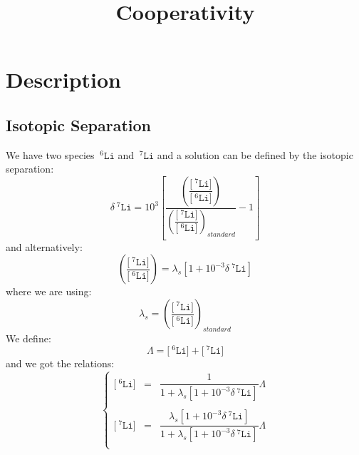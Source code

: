 \documentclass[aps,onecolumn,11pt]{revtex4}
\newcommand{\mychem}[1]{\mathtt{#1}}
\newcommand{\myconc}[1]{\big[#1\big]}
\newcommand{\spLi}[1]{{\!~^{#1}\mychem{Li}}}
\newcommand{\Li}[1]{\myconc{\spLi{#1}}}
\newcommand{\deltaLi}{\delta\!\!\spLi{7}}
\newcommand{\LiAll}{\Lambda}
\begin{document}
\title{Cooperativity}
\maketitle

\section{Description}
\subsection{Isotopic Separation}
We have two species $\spLi{6}$ and $\spLi{7}$ and a solution can be defined by the isotopic 
separation:
\begin{equation}
	\deltaLi = 10^3 \left[ 
	\dfrac{
	\left(\dfrac{\Li{7}}{\Li{6}}\right)
	}
	{
	\left(\dfrac{\Li{7}}{\Li{6}}\right)_{standard}
	}
	- 1 \right]
\end{equation}
and alternatively:
\begin{equation}
	\left(\dfrac{\Li{7}}{\Li{6}}\right) = \lambda_s \left[ 1+10^{-3} \deltaLi \right]
\end{equation}
where we are using:
\begin{equation}
	\lambda_s = \left(\dfrac{\Li{7}}{\Li{6}}\right)_{standard} %
\end{equation}
We define:
\begin{equation}
	\LiAll = \Li{6}+\Li{7}
\end{equation}
and we got the relations:
\begin{equation}
\left\lbrace
\begin{array}{rcl}
\Li{6} & = & \dfrac{1}{1+\lambda_s[1+10^{-3}\deltaLi]} \LiAll \\
\\
\Li{7} & = &  \dfrac{\lambda_s[1+10^{-3}\deltaLi]}{1+\lambda_s[1+10^{-3}\deltaLi]}\LiAll\\
\end{array}
\right.
\end{equation}
\end{document}
